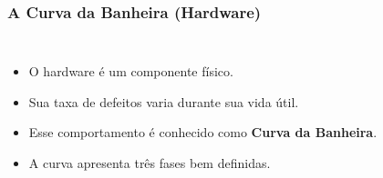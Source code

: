 \documentclass[9pt]{beamer}
\begin{document}
\begin{frame}
    \frametitle{A Curva da Banheira (Hardware)}
    
    \begin{columns}
    
    
    \begin{itemize}
    \item O hardware é um componente físico.
    
    \item Sua taxa de defeitos varia durante sua vida útil.
    
    \item Esse comportamento é conhecido como
    \textbf{Curva da Banheira}.
    
    \item A curva apresenta três fases bem definidas.
    \end{itemize}
    
    
    \centering
    
    
    \end{columns}
    
    \end{frame}
    
\end{document}
